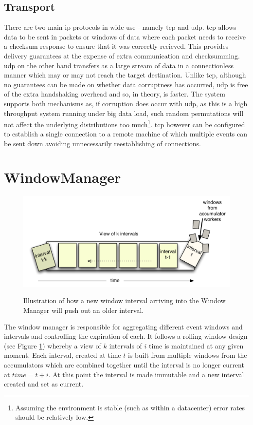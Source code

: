 \documentclass[a4paper,11pt]{scrreprt}
\begin{document}
\subsection{Transport}
There are two main \acrshort{ip} protocols in wide use - namely \acrshort{tcp} and \acrshort{udp}. \acrshort{tcp} allows data to be sent in packets or windows of data where each packet needs to receive a checksum response to ensure that it was correctly recieved. This provides delivery guarantees at the expense of extra communication and checksumming. \acrshort{udp} on the other hand transfers as a large stream of data in a connectionless manner which may or may not reach the target destination. Unlike \acrshort{tcp}, although no guarantees can be made on whether data corruptness has occurred, \acrshort{udp} is free of the extra handshaking overhead and so, in theory, is faster. The system supports both mechanisms as, if corruption does occur with \acrshort{udp}, as this is a high throughput system running under big data load, such random permutations will not affect the underlying distributions too much\footnote{Assuming the environment is stable (such as within a datacenter) error rates should be relatively low.}. \acrshort{tcp} however can be configured to establish a single connection to a remote machine of which multiple events can be sent down avoiding unnecessarily reestablishing of connections.
\section{WindowManager}
\begin{figure}[h!]
\centering
\caption{Illustration of how a new window interval arriving into the Window Manager will push out an older interval.}
\includegraphics[scale=0.72, trim=0 0 0 12, clip=true] {window.pdf}
\label{fig:rollingwindow}
\end{figure}
The window manager is responsible for aggregating different event windows and intervals and controlling the expiration of each. It follows a rolling window design (see Figure \ref{fig:rollingwindow}) whereby a view of \(k\) intervals of \(i\) time is maintained at any given moment. Each interval, created at time \(t\) is built from multiple windows from the accumulators which are combined together until the interval is no longer current at \(time = t+i\). At this point the interval is made immutable and a new interval created and set as current. 
\end{document}
